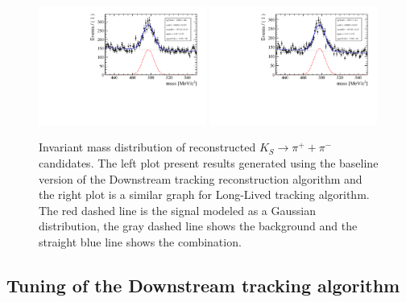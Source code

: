 \begin{figure}[tbph]
\begin{center}
\includegraphics[rotate=-90, width = 0.49\textwidth]{figures/tracking_ks/Mas_ks_baseline.pdf} 
\includegraphics[rotate=-90, width = 0.49\textwidth]{figures/tracking_ks/Mas_ks_bdt.pdf}
\caption{Invariant mass distribution of reconstructed $K_S \rightarrow \pi^{+} + \pi^{-}$ candidates.  The left plot present results generated using the baseline version of the Downstream tracking reconstruction algorithm and the right plot is a  similar graph for Long-Lived tracking algorithm. The red  dashed line is the signal modeled as a Gaussian distribution, the gray dashed line shows the background and the straight blue line shows the combination.}
\label{fig:Ks_performance}
 \end{center}
 \end{figure}

\subsection{Tuning of the Downstream tracking algorithm}
\label{sec:cut finetuning}

